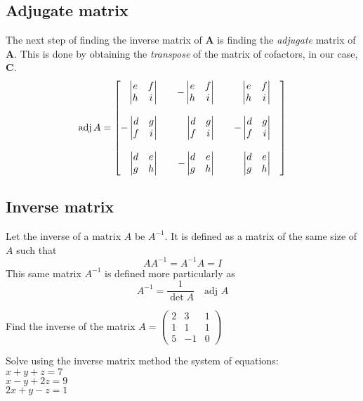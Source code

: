 \subsection{Adjugate matrix}
The next step of finding the inverse matrix of $\mathbf A$ is finding the \emph{adjugate} matrix of $\mathbf A$. This is done by obtaining the \emph{transpose} of the matrix of cofactors, in our case, $\mathbf C$.
\[
\adj A =
\begin{bmatrix*}[r]
\begin{vmatrix}e&f\\h&i\end{vmatrix}&&-\begin{vmatrix}e&f\\h&i\end{vmatrix}&&\begin{vmatrix}e&f\\h&i\end{vmatrix}\phantom{-}\\\\
-\begin{vmatrix}d&g\\f&i\end{vmatrix}&&\begin{vmatrix}d&g\\f&i\end{vmatrix}&&-\begin{vmatrix}d&g\\f&i\end{vmatrix}\phantom{-}\\\\
\begin{vmatrix}d&e\\g&h\end{vmatrix}&&-\begin{vmatrix}d&e\\g&h\end{vmatrix}&&\begin{vmatrix}d&e\\g&h\end{vmatrix}\phantom{-}
\end{bmatrix*}
\]
\subsection{Inverse matrix}
Let the inverse of a matrix $A$ be $A^{-1}$. It is defined as a matrix of the same size of $A$ such that \[AA^{-1} = A^{-1}A = I\]
This same matrix $A^{-1}$ is defined more particularly as \[A^{-1} = \frac{1}{\det A}\quad\text{adj }A\]
\begin{example}
	Find the inverse of the matrix $A = \begin{pmatrix*}
										2&3&1\\
										1&1&1\\
										5&-1&0
										\end{pmatrix*}$
	\end{example}
\begin{example}
Solve using the inverse matrix method the system of equations:\\
$x+y+z=7$\\
$x-y+2z=9$\\
$2x+y-z=1$
\end{example}
\newpage
